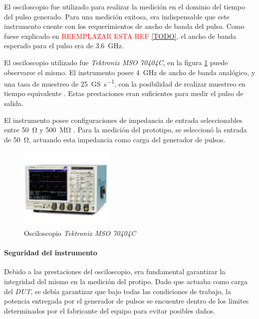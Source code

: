 El osciloscopio fue utilizado para realizar la medición en el dominio del tiempo
del pulso generado. Para una medición exitosa, era indispensable que este
instrumento cuente con los requerimientos de ancho de banda del pulso. Como fuese
explicado en \textcolor{red}{REEMPLAZAR ESTA REF \ref{TODO}}, el ancho de banda
esperado para el pulso era de \qty{3.6}{\giga\hertz}.

El osciloscopio utilizado fue \textit{Tektronix MSO 70404C}, en la figura 
\ref{fig:osciloscopio} puede observarse el mismo. El instrumento posee 
\qty{4}{\giga\hertz} de ancho de banda analógico, y una tasa de muestreo
de \qty[per-mode=symbol]{25}{\giga\siemens\per\second}, con la posibilidad de
realizar muestreo en tiempo equivalente \cite{oscilloscope_datasheet}. Estas
prestaciones eran suficientes para medir el pulso de salida.

El instrumento posee configuraciones de impedancia de entrada seleccionables entre
\qty{50}{\ohm} y \qty{500}{\mega\ohm} \cite{oscilloscope_datasheet}. Para la
medición del prototipo, se seleccionó la entrada de \qty{50}{\ohm}, actuando
esta impedancia como carga del generador de pulsos.

\begin{figure}
  \centering
    \includegraphics[width=0.4\textwidth]{images/osciloscopio.png}
    \caption{Osciloscopio \textit{Tektronix MSO 70404C}}
    \label{fig:osciloscopio}
\end{figure}

\paragraph{Seguridad del instrumento}

Debido a las prestaciones del osciloscopio, era fundamental garantizar la
integridad del mismo en la medición del protipo. Dado que actuaba como carga del
\textit{DUT}, se debía garantizar que bajo todas las condiciones de
trabajo, la potencia entregada por el generador de pulsos se encuentre dentro de
los límites determinados por el fabricante del equipo para evitar posibles daños.

